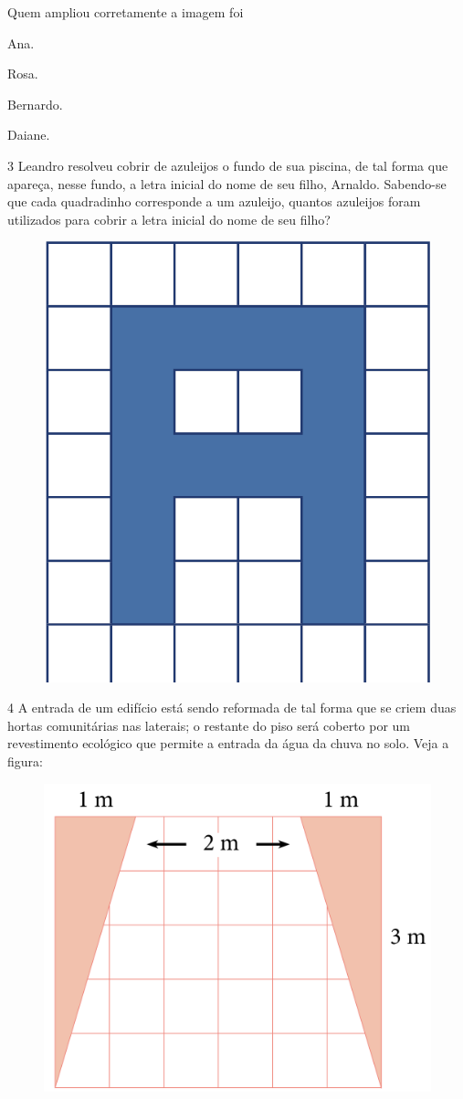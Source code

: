 Quem ampliou corretamente a imagem foi

\begin{multicols}{2}
\begin{escolha}
\item
  Ana.
\item
  Rosa.
\item
  Bernardo.
\item
  Daiane. 
\end{escolha}
\end{multicols}

\num{3} Leandro resolveu cobrir de azuleijos o fundo de sua piscina, de tal
forma que apareça, nesse fundo, a letra inicial do nome de seu filho,
Arnaldo. Sabendo-se que cada quadradinho corresponde a um azuleijo,
quantos azuleijos foram utilizados para cobrir a letra inicial do nome
de seu filho?\enlargethispage{3\baselineskip}

\begin{figure}[htpb!]
\centering
\includegraphics[width=.35\textwidth]{../ilustracoes/MAT5/SAEB_5ANO_MAT_figura37.png}
\end{figure}



\num{4} A entrada de um edifício está sendo reformada de tal forma que se
criem duas hortas comunitárias nas laterais; o restante do piso será coberto por um revestimento ecológico que permite a entrada da água da chuva no solo. Veja
a figura:

\begin{figure}[htpb!]
\centering
\includegraphics[width=.45\textwidth]{../ilustracoes/MAT5/SAEB_5ANO_MAT_figura38.png}
\end{figure}

